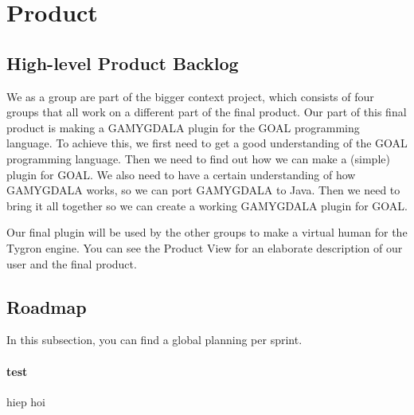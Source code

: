 \section{Product}
\subsection{High-level Product Backlog}
We as a group are part of the bigger context project, which consists of four groups that all work on a different part of the final product. Our part of this final product is making a GAMYGDALA plugin for the GOAL programming language. To achieve this, we first need to get a good understanding of the GOAL programming language. Then we need to find out how we can make a (simple) plugin for GOAL. We also need to have a certain understanding of how GAMYGDALA works, so we can port GAMYGDALA to Java. Then we need to bring it all together so we can create a working GAMYGDALA plugin for GOAL. \\ \par
Our final plugin will be used by the other groups to make a virtual human for the Tygron engine. You can see the Product View for an elaborate description of our user and the final product.

\subsection{Roadmap}
In this subsection, you can find a global planning per sprint.

\paragraph{test} hiep hoi